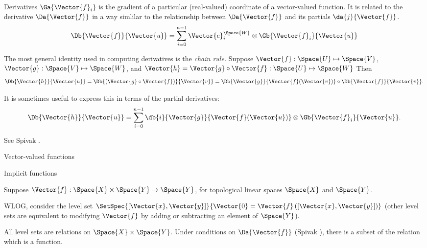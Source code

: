 \begin{plSection}{Derivatives}
$\Ga{\Vector{f}_i}$ is the gradient of a particular (real-valued) coordinate
of a vector-valued function. It is related to the derivative $\Da{\Vector{f}}$
in a way simlilar to the relationship between $\Da{\Vector{f}}$ and its partials $\da{j}{\Vector{f}}$.
\begin{equation}
\Db{\Vector{f}}{\Vector{u}} = \sum_{i=0}^{n-1}  \Vector{e}_i^{\Space{W}} \otimes \Gb{\Vector{f}_i}{\Vector{u}}
\end{equation}

The most general identity used in computing derivatives is the \textit{chain rule.}
Suppose
$\Vector{f}:\Space{U} \mapsto \Space{V}$,
$\Vector{g}:\Space{V} \mapsto \Space{W}$,
and
$\Vector{h} = \Vector{g} \circ \Vector{f} : \Space{U} \mapsto \Space{W}$
Then
\begin{equation}
\label{eq:chain-rule}
\Db{\Vector{h}}{\Vector{u}}
=  \Db{(\Vector{g} \circ \Vector{f})}{\Vector{v}}
=  \Db{\Vector{g}}{\Vector{f}(\Vector{v})}  \circ  \Db{\Vector{f}} {\Vector{v}}.
\end{equation}

It is sometimes useful to express this in terms of the partial derivatives:
\begin{equation}
\label{eq:chain-rule_partials}
\Db{\Vector{h}}{\Vector{u}} =  \sum_{i=0}^{n-1} \db{i}{\Vector{g}}{\Vector{f}(\Vector{u})} \otimes  \Gb{\Vector{f}_i}{\Vector{u}}.
\end{equation}

See Spivak \cite[Theorem~2-2]{Spivak:1965:CalculusOnManifolds}.

\begin{plSection}{Vector-valued functions}
\label{sec:Derivatives-of-Vector-valued-functions}

\begin{plSection}{Implicit functions}
\label{sec:Derivatives-of-implicit-functions}

Suppose 
$\Vector{f} : \Space{X} \times \Space{Y} \rightarrow \Space{Y}$,
for topological linear spaces $\Space{X}$ and $\Space{Y}$.

WLOG, consider the level set 
$\SetSpec{\left[ \Vector{x} , \Vector{y} \right]}
{\Vector{0} = \Vector{f}\left( \left[ \Vector{x} , \Vector{y} \right] \right)}$
(other level sets are equivalent to modifying $\Vector{f}$
by adding or subtracting 
an element of $\Space{Y}$).

All level sets are relations on $\Space{X} \times \Space{Y}$.
Under conditions on $\Da{\Vector{f}}$
(Spivak \cite[Theorem~2-12]{Spivak:1965:CalculusOnManifolds}),
there is a subset of the relation which is a 
function.


\end{plSection}
\end{plSection}
\end{plSection}
